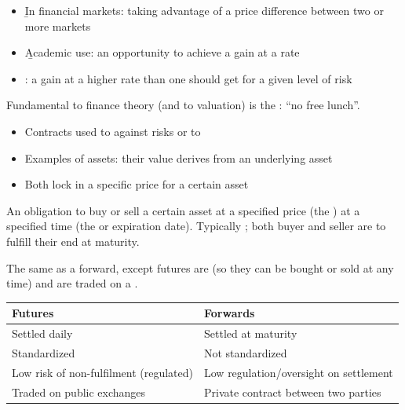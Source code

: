 \begin{definition}[Arbitrage]
    \begin{itemize}
        \item \b{In financial markets}: taking advantage of a price difference between two or more markets
        \item \b{Academic use}: an opportunity to achieve a  gain at a rate 
        \item {}: a gain at a higher rate than one should get for a given level of risk
    \end{itemize}
    Fundamental to finance theory (and to valuation) is the
    : ``no free lunch''.
\end{definition}

\begin{itemize}
    \item Contracts used to  against risks or to 
    \item Examples of  assets: their value derives from an underlying asset
    \item Both lock in a specific price for a certain asset
\end{itemize}

\begin{definition}
    An obligation to buy or sell a certain asset at a specified price (the
    ) at a specified time (the  or expiration
    date). Typically ; both buyer and seller are
     to fulfill their end at maturity.
\end{definition}

\begin{definition}
    The same as a forward, except futures are  (so they can
    be bought or sold at any time) and are traded on a .
\end{definition}

\begin{center}
    \begin{tabular}{ll}
        \toprule
        Futures & Forwards \\
        \midrule
        Settled daily & Settled at maturity \\
        Standardized & Not standardized \\
        Low risk of non-fulfilment (regulated) & Low regulation/oversight on settlement \\
        Traded on public exchanges & Private contract between two parties \\
        \bottomrule
    \end{tabular}
\end{center}

